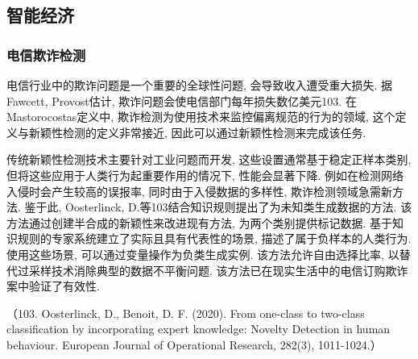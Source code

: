 \documentclass{Style/aas}
\begin{document}
\begin{multicols}{2}
\subsection{智能经济}
\subsubsection{电信欺诈检测}
电信行业中的欺诈问题是一个重要的全球性问题, 会导致收入遭受重大损失. 据Fawcett, Provost估计, 欺诈问题会使电信部门每年损失数亿美元103. 在Mastorocostas定义中, 欺诈检测为使用技术来监控偏离规范的行为的领域, 这个定义与新颖性检测的定义非常接近, 因此可以通过新颖性检测来完成该任务. 

传统新颖性检测技术主要针对工业问题而开发, 这些设置通常基于稳定正样本类别, 但将这些应用于人类行为起重要作用的情况下, 性能会显著下降. 例如在检测网络入侵时会产生较高的误报率, 同时由于入侵数据的多样性, 欺诈检测领域急需新方法. 鉴于此, Oosterlinck, D.等103结合知识规则提出了为未知类生成数据的方法. 该方法通过创建半合成的新颖性来改进现有方法, 为两个类别提供标记数据. 基于知识规则的专家系统建立了实际且具有代表性的场景, 描述了属于负样本的人类行为. 使用这些场景, 可以通过变量操作为负类生成实例. 该方法允许自由选择比率, 以替代过采样技术消除典型的数据不平衡问题. 该方法已在现实生活中的电信订购欺诈案中验证了有效性. 

（103.	Oosterlinck, D., Benoit, D. F. (2020). From one-class to two-class classification by incorporating expert knowledge: Novelty Detection in human behaviour. European Journal of Operational Research, 282(3), 1011-1024.）


\end{multicols}
\end{document}
